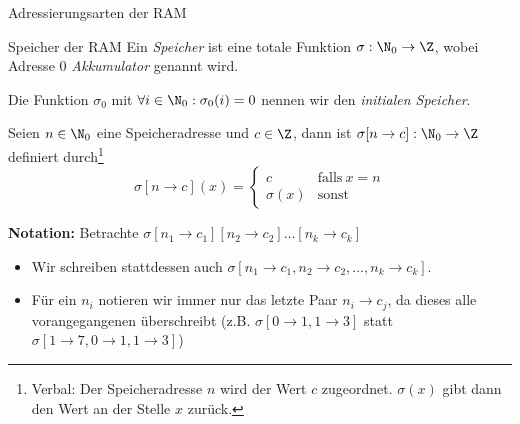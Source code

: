 \documentclass[german]{spicker}
\begin{document}
\begin{bonus}{Adressierungsarten der RAM}
\begin{center}
  \end{center}
\end{bonus}

\begin{defi}{Speicher der RAM}
  Ein \emph{Speicher} ist eine totale Funktion $\sigma : \N_0 \to \Z$, wobei Adresse $0$ \emph{Akkumulator} genannt wird.

  Die Funktion $\sigma_0$ mit $\forall i \in \N_0 : \sigma_0(i) = 0$ nennen wir den \emph{initialen Speicher}.

  Seien $n \in \N_0$ eine Speicheradresse und $c \in \Z$, dann ist $\sigma[n\to c] : \N_0 \to \Z$ definiert durch\footnote{Verbal: Der Speicheradresse $n$ wird der Wert $c$ zugeordnet. $\sigma(x)$ gibt dann den Wert an der Stelle $x$ zurück.}
  $$
    \boxed{
      \sigma[n\to c](x) = \begin{cases}
        c         & \text{falls} \ x=n \\
        \sigma(x) & \text{sonst}
      \end{cases}
    }
  $$

  \textbf{Notation:}
  Betrachte $\sigma[n_1\to c_1][n_2 \to c_2]\ldots [n_k\to c_k]$
  \begin{itemize}
    \item Wir schreiben stattdessen auch $\sigma[n_1\to c_1,n_2 \to c_2,\ldots ,n_k\to c_k]$.
    \item Für ein $n_i$ notieren wir immer nur das letzte Paar $n_i \to c_j$, da dieses alle vorangegangenen überschreibt
          (z.B. $\sigma[0\to 1, 1\to 3]$ statt $\sigma[1\to 7, 0\to 1, 1\to 3]$)
  \end{itemize}
\end{defi}
\end{document}
